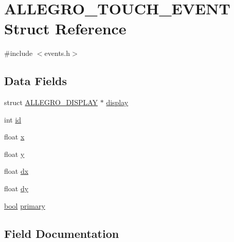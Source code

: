 \hypertarget{struct_a_l_l_e_g_r_o___t_o_u_c_h___e_v_e_n_t}{}\section{A\+L\+L\+E\+G\+R\+O\+\_\+\+T\+O\+U\+C\+H\+\_\+\+E\+V\+E\+NT Struct Reference}
\label{struct_a_l_l_e_g_r_o___t_o_u_c_h___e_v_e_n_t}


{\ttfamily \#include $<$events.\+h$>$}

\subsection*{Data Fields}
\begin{DoxyCompactItemize}
\item 
struct \hyperlink{display_8h_a7516185aa39c086f4bc62bd4bf5858bf}{A\+L\+L\+E\+G\+R\+O\+\_\+\+D\+I\+S\+P\+L\+AY} $\ast$ \hyperlink{struct_a_l_l_e_g_r_o___t_o_u_c_h___e_v_e_n_t_a4bced23a8df63cf07e8cdc3b00fa39d2}{display}
\item 
int \hyperlink{struct_a_l_l_e_g_r_o___t_o_u_c_h___e_v_e_n_t_af47760cf174d1542acc7457798e78637}{id}
\item 
float \hyperlink{struct_a_l_l_e_g_r_o___t_o_u_c_h___e_v_e_n_t_a202bca023c7ee2ec4a69a932c25748ec}{x}
\item 
float \hyperlink{struct_a_l_l_e_g_r_o___t_o_u_c_h___e_v_e_n_t_aa73d266e43e39b0525110b42dbce0b19}{y}
\item 
float \hyperlink{struct_a_l_l_e_g_r_o___t_o_u_c_h___e_v_e_n_t_a8186842274aae6ce7a73e40b83841966}{dx}
\item 
float \hyperlink{struct_a_l_l_e_g_r_o___t_o_u_c_h___e_v_e_n_t_af9e227b9d350cc35fa18448a7806e58c}{dy}
\item 
\hyperlink{astdbool_8h_abb452686968e48b67397da5f97445f5b}{bool} \hyperlink{struct_a_l_l_e_g_r_o___t_o_u_c_h___e_v_e_n_t_ac1bda9e06b16656df73bc718568d3bb5}{primary}
\end{DoxyCompactItemize}


\subsection{Field Documentation}
\mbox{\label{struct_a_l_l_e_g_r_o___t_o_u_c_h___e_v_e_n_t_a4bced23a8df63cf07e8cdc3b00fa39d2}} 
